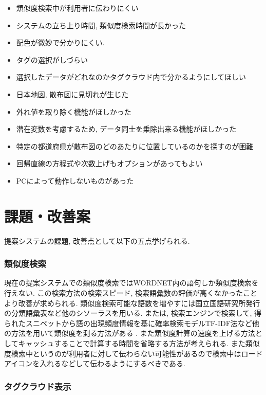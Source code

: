 \documentclass[sotsuron]{kuee}
\begin{document}
\begin{itemize}
\item 類似度検索中が利用者に伝わりにくい
 \item システムの立ち上り時間, 類似度検索時間が長かった
 \item 配色が微妙で分かりにくい.
 \item タグの選択がしづらい
 \item 選択したデータがどれなのかタグクラウド内で分かるようにしてほしい
 \item 日本地図, 散布図に見切れが生じた
 \item 外れ値を取り除く機能がほしかった
 \item 潜在変数を考慮するため, データ同士を乗除出来る機能がほしかった
 \item 特定の都道府県が散布図のどのあたりに位置しているのかを探すのが困難
 \item 回帰直線の方程式や次数上げもオプションがあってもよい
 \item PCによって動作しないものがあった
\end{itemize}

\section{課題・改善案}

提案システムの課題, 改善点として以下の五点挙げられる.

\subsubsection{類似度検索}

現在の提案システムでの類似度検索ではWORDNET内の語句しか類似度検索を行えない.
この検索方法の検索スピード, 検索語彙数の評価が高くなかったことより改善が求められる.
類似度検索可能な語数を増やすには国立国語研究所発行の分類語彙表など他のシソーラスを用いる.
または, 検索エンジンで検索して, 得られたスニペットから語の出現頻度情報を基に確率検索モデルTF-IDF法など他の方法を用いて類似度を測る方法がある
\cite{5.3-1}. また類似度計算の速度を上げる方法としてキャッシュすることで計算する時間を省略する方法が考えられる.
また類似度検索中というのが利用者に対して伝わらない可能性があるので検索中はロードアイコンを入れるなどして伝わるようにするべきである.

\subsubsection{タグクラウド表示}
\end{document}
